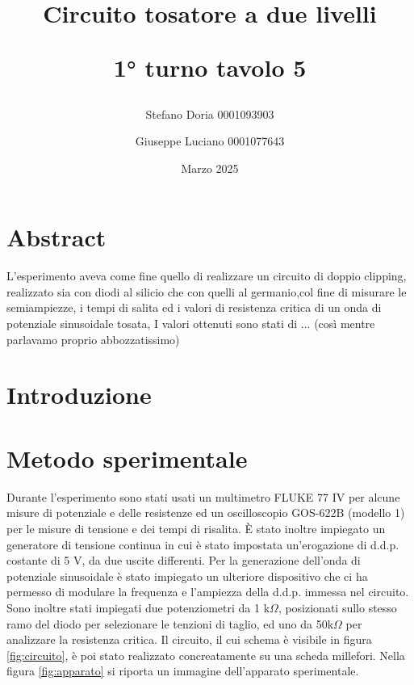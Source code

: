 \documentclass[a4paper,11pt]{article}
\begin{document}
\title{\textbf{Circuito tosatore a due livelli}

1° turno tavolo 5}
\author{Stefano Doria 0001093903 \and Giuseppe Luciano 0001077643}

\date{Marzo 2025}

\maketitle

\section{Abstract}

L'esperimento aveva come fine quello di realizzare un circuito di doppio clipping, realizzato sia con diodi al silicio che con quelli al germanio,col fine di misurare le semiampiezze, i tempi di salita ed i valori di resistenza critica di un onda di potenziale sinusoidale tosata, I valori ottenuti sono stati di ... (così mentre parlavamo proprio abbozzatissimo)


\section{Introduzione}


\section{Metodo sperimentale}

Durante l'esperimento sono stati usati un multimetro FLUKE 77 IV per alcune misure di potenziale e delle resistenze ed un oscilloscopio GOS-622B (modello 1) per le misure di tensione e dei tempi di risalita. È stato inoltre impiegato un generatore di tensione continua in cui è stato impostata un'erogazione di d.d.p. costante di 5 V, da due uscite differenti. Per la generazione dell'onda di potenziale sinusoidale è stato impiegato un ulteriore dispositivo che ci ha permesso di modulare la frequenza e l'ampiezza della d.d.p. immessa nel circuito. Sono inoltre stati impiegati due potenziometri da 1 k$\Omega$, posizionati sullo stesso ramo del diodo per selezionare le tenzioni di taglio, ed uno da 50k$\Omega$ per analizzare la resistenza critica. Il circuito, il cui schema è visibile in figura \ref{fig:circuito}, è poi stato realizzato concreatamente su una scheda millefori. Nella figura \ref{fig:apparato} si riporta un immagine dell'apparato sperimentale.
\end{document}
